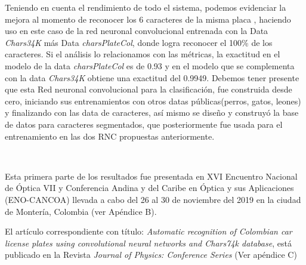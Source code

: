 \begin{tcolorbox}
[colback=blue!5!white,colframe=blue!45!black,fonttitle=\bfseries,title=Conclusión]

Teniendo en cuenta el rendimiento de todo el sistema, podemos evidenciar la mejora al momento de reconocer los 6 caracteres de la misma placa , haciendo uso en este caso de la red neuronal convolucional entrenada con la Data \textit{Chars34K} más Data \textit{charsPlateCol}, donde logra reconocer el 100\% de los caracteres. Si el análisis lo relacionamos con las métricas, la exactitud en el modelo de la data \textit{charsPlateCol} es de 0.93 y en el modelo que se complementa con la data \textit{Chars34K} obtiene una exactitud del 0.9949. Debemos tener presente que esta Red neuronal convolucional para la clasificación, fue construida desde cero, iniciando sus entrenamientos con otros datas públicas(perros, gatos, leones) y finalizando con las data de caracteres, así mismo se diseño y construyó la base de datos para caracteres segmentados, que posteriormente fue usada para el entrenamiento en las dos RNC propuestas anteriormente.


\begin{table}[H]
\begin{center}
 \caption{\label{blobs}Resultados por entrenamiento.}
\label{tabla:resultados metricas}
\end{center}
\end{table}
\end{tcolorbox}
\\

\begin{tcolorbox}
[colback=green!5!white,colframe=green!45!black,fonttitle=\bfseries,title=Contribución]

Esta primera parte de los resultados fue presentada en XVI Encuentro Nacional de Óptica VII y Conferencia Andina y del Caribe en Óptica y sus Aplicaciones (ENO-CANCOA) llevada a cabo del 26 al 30 de noviembre del 2019 en la ciudad de Montería, Colombia (ver Apéndice B).

El artículo correspondiente con título: 
\emph{Automatic recognition of Colombian car license plates using convolutional neural networks and Chars74k database}, está publicado en la Revista \emph{Journal of Physics: Conference Series} \cite{Arroyo-Perez2020ColombianLearning} (Ver apéndice C)
\end{tcolorbox}
